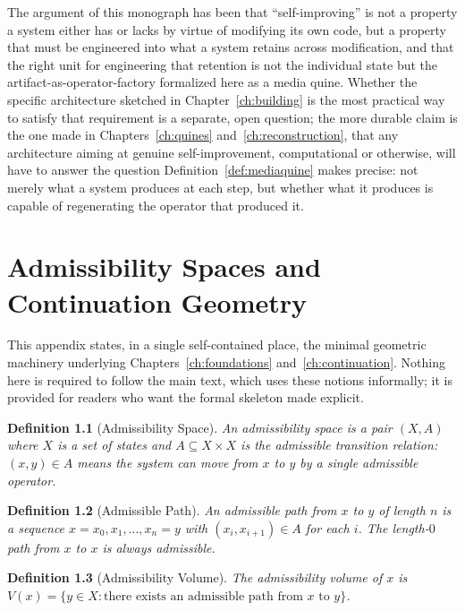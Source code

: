 \documentclass[11pt]{book}
\newtheorem{definition}{Definition}[chapter]
\begin{document}
The argument of this monograph has been that ``self-improving'' is not a property a system either has or lacks by virtue of modifying its own code, but a property that must be engineered into what a system retains across modification, and that the right unit for engineering that retention is not the individual state but the artifact-as-operator-factory formalized here as a media quine. Whether the specific architecture sketched in Chapter~\ref{ch:building} is the most practical way to satisfy that requirement is a separate, open question; the more durable claim is the one made in Chapters~\ref{ch:quines} and~\ref{ch:reconstruction}, that any architecture aiming at genuine self-improvement, computational or otherwise, will have to answer the question Definition~\ref{def:mediaquine} makes precise: not merely what a system produces at each step, but whether what it produces is capable of regenerating the operator that produced it.

\appendix

\chapter{Admissibility Spaces and Continuation Geometry}
\label{app:admissibility}

This appendix states, in a single self-contained place, the minimal geometric machinery underlying Chapters~\ref{ch:foundations} and~\ref{ch:continuation}. Nothing here is required to follow the main text, which uses these notions informally; it is provided for readers who want the formal skeleton made explicit.

\begin{definition}[Admissibility Space]
An \emph{admissibility space} is a pair $(X,A)$ where $X$ is a set of states and $A\subseteq X\times X$ is the admissible transition relation: $(x,y)\in A$ means the system can move from $x$ to $y$ by a single admissible operator.
\end{definition}

\begin{definition}[Admissible Path]
An \emph{admissible path} from $x$ to $y$ of length $n$ is a sequence $x=x_0,x_1,\dots,x_n=y$ with $(x_i,x_{i+1})\in A$ for each $i$. The length-$0$ path from $x$ to $x$ is always admissible.
\end{definition}

\begin{definition}[Admissibility Volume]
The \emph{admissibility volume} of $x$ is $V(x) = \{y\in X : \text{there exists an admissible path from } x \text{ to } y\}$.
\end{definition}
\end{document}
